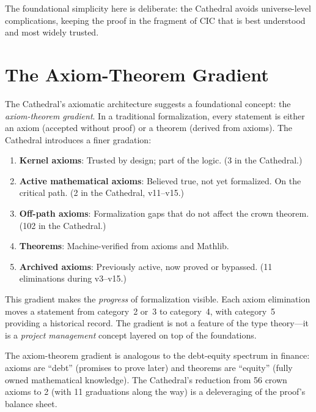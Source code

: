 \documentclass[11pt,a4paper]{article}
\begin{document}
The foundational simplicity here is deliberate: the Cathedral avoids
universe-level complications, keeping the proof in the fragment of
CIC that is best understood and most widely trusted.

\section{The Axiom-Theorem Gradient}
\label{sec:gradient}

The Cathedral's axiomatic architecture suggests a foundational
concept: the \emph{axiom-theorem gradient}. In a traditional
formalization, every statement is either an axiom (accepted without
proof) or a theorem (derived from axioms). The Cathedral introduces
a finer gradation:

\begin{enumerate}
  \item \textbf{Kernel axioms}: Trusted by design; part of the logic.
    (3 in the Cathedral.)
  \item \textbf{Active mathematical axioms}: Believed true, not yet
    formalized. On the critical path. (2 in the Cathedral, v11--v15.)
  \item \textbf{Off-path axioms}: Formalization gaps that do not
    affect the crown theorem. (102 in the Cathedral.)
  \item \textbf{Theorems}: Machine-verified from axioms and Mathlib.
  \item \textbf{Archived axioms}: Previously active, now proved or
    bypassed. (11 eliminations during v3--v15.)
\end{enumerate}

This gradient makes the \emph{progress} of formalization visible.
Each axiom elimination moves a statement from category~2 or~3 to
category~4, with category~5 providing a historical record. The
gradient is not a feature of the type theory---it is a \emph{project
management} concept layered on top of the foundations.

\begin{remark}
The axiom-theorem gradient is analogous to the debt-equity spectrum
in finance: axioms are ``debt'' (promises to prove later) and theorems
are ``equity'' (fully owned mathematical knowledge). The Cathedral's
reduction from 56 crown axioms to 2 (with 11 graduations along the way)
is a deleveraging of the proof's balance sheet.
\end{remark}
\end{document}

